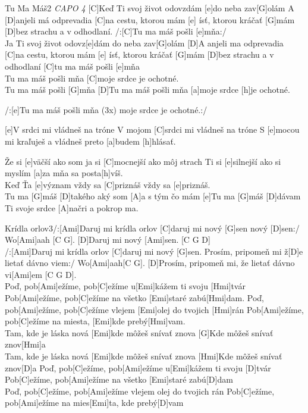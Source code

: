\documentclass[12pt]{article}
\begin{document}
\begin{song}{Tu Ma Máš}{2}
	\textit{CAPO 4}
	[C]Keď Ti svoj život odovzdám 
	[e]do neba zav[G]olám
	A [D]anjeli má odprevadia 
	[C]na cestu, ktorou mám [e] ísť,
	ktorou kráčať [G]mám
	[D]bez strachu a v odhodlaní.
	/:[C]Tu ma máš pošli [e]mňa:/
	\\
	[C]Ja Ti svoj život odovz[e]dám 
	do neba zav[G]olám
	[D]A anjeli ma odprevadia 
	[C]na cestu, ktorou mám [e] ísť,
	ktorou kráčať [G]mám
	[D]bez strachu a v odhodlaní
	[C]tu ma máš pošli [e]mňa
	\\
	[D]Tu ma máš pošli mňa
	[C]moje srdce je ochotné.
	\\
	[e]Tu ma máš pošli [G]mňa
	[D]Tu ma máš pošli mňa
	[a]moje srdce [h]je ochotné.
	
	/:[e]Tu ma máš pošli mňa (3x)
	moje srdce je ochotné.:/
	
	[e]V srdci mi vládneš na tróne
	V mojom [C]srdci mi vládneš na tróne
	S [e]mocou mi kraľuješ a vládneš 
	preto [a]budem [h]hlásať.
	
	Že si [e]väčší ako som ja
	si [C]mocnejší ako môj strach
	Ti si [e]silnejší ako si myslím 
	[a]za mňa sa posta[h]víš.
	\\
	Keď Ťa [e]význam 
	vždy sa [C]priznáš 
	vždy sa [e]priznáš.
	\\
	[e]Tu ma [G]máš 
	[D]takého aký som 
	[A]a s tým čo mám
	[e]Tu ma [G]máš 
	[D]dávam Ti svoje srdce
	[A]načri a pokrop ma.
\end{song}

\begin{song}{Krídla orlov}{3}/:[Ami]Daruj mi krídla orlov
	[C]daruj mi nový [G]sen
	nový [D]sen:/ Wo[Ami]aah [C G].
	[D]Daruj mi nový [Ami]sen. [C G D] 
	\\
	/:[Ami]Daruj mi krídla orlov
	[C]daruj mi nový [G]sen.
	Prosím, pripomeň mi
	ž[D]e lietať dávno viem:/ 
	Wo[Ami]aah[C G].
	[D]Prosím, pripomeň mi,
	že lietať dávno vi[Ami]em [C G D].
	\\
	Poď, pob[Ami]ežíme, pob[C]ežíme
	u[Emi]kážem ti svoju [Hmi]tvár
	Pob[Ami]ežíme, pob[C]ežíme
	na všetko [Emi]staré zabú[Hmi]dam.
	\columnbreak
	Poď, pob[Ami]ežíme, pob[C]ežíme
	vlejem [Emi]olej do tvojich [Hmi]rán
	Pob[Ami]ežíme, pob[C]ežíme
	na miesta, [Emi]kde prebý[Hmi]vam.
	\\
	[C]Tam, kde je láska nová
	[Emi]kde môžeš snívať znova
	[G]Kde môžeš snívať znov[Hmi]a
	\\
	[Ami]Tam, kde je láska nová
	[Emi]kde môžeš snívať znova
	[Hmi]Kde môžeš snívať znov[D]a
	\columnbreak
	Poď, pob[C]ežíme, pob[Ami]ežíme
	u[Emi]kážem ti svoju [D]tvár
	Pob[C]ežíme, pob[Ami]ežíme
	na všetko [Emi]staré zabú[D]dam
	\\
	Poď, pob[C]ežíme, pob[Ami]ežíme
	vlejem olej do tvojich rán
	Pob[C]ežíme, pob[Ami]ežíme
	na mies[Emi]ta, kde prebý[D]vam
\end{song}
\end{document}
